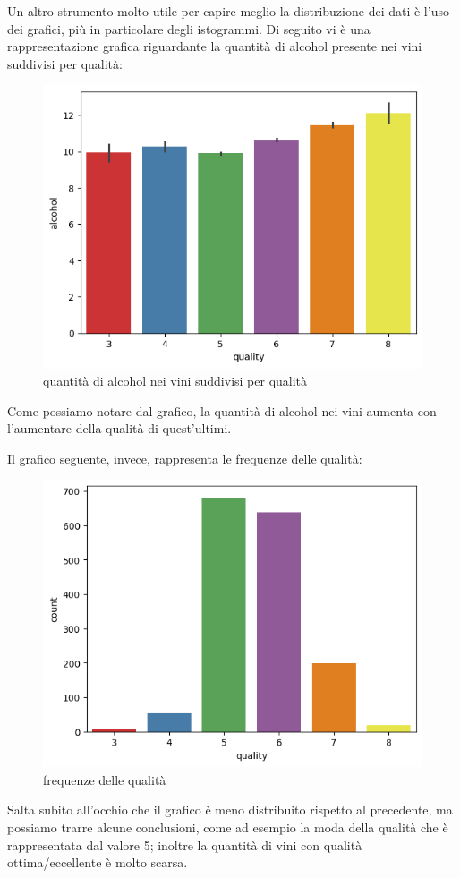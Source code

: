 \documentclass{article}
\begin{document}
\begin{titlepage}
        \newpage
        Un altro strumento molto utile per capire meglio la distribuzione dei dati è l'uso dei grafici, più in particolare degli istogrammi. Di seguito vi è una rappresentazione grafica riguardante la quantità di alcohol presente nei vini suddivisi per qualità:

        \begin{figure}[ht]
            \centering
            \includegraphics[width=0.5\linewidth]{barPlot-alcohol.png}
            \caption{ quantità di alcohol nei vini suddivisi per qualità}
            \label{fig:enter-label}
        \end{figure}

        Come possiamo notare dal grafico, la quantità di alcohol nei vini aumenta con l'aumentare della qualità di quest'ultimi.
        
        Il grafico seguente, invece, rappresenta le frequenze delle qualità:
        
        \begin{figure}[ht]
            \centering
            \includegraphics[width=0.5\linewidth]{countPlot-quality.png}
            \caption{ frequenze delle qualità}
            \label{fig:enter-label}
        \end{figure}

        Salta subito all'occhio che il grafico è meno distribuito rispetto al precedente, ma possiamo trarre alcune conclusioni, come ad esempio la moda della qualità che è rappresentata dal valore 5; inoltre la quantità di vini con qualità ottima/eccellente è molto scarsa.


\end{titlepage}
\end{document}
